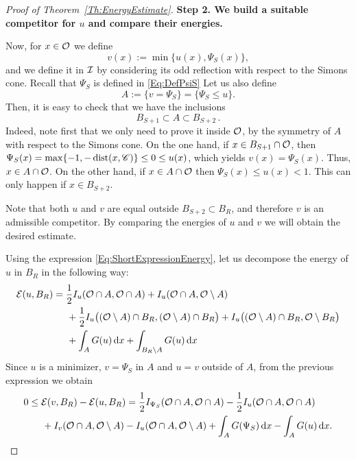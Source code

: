 \begin{proof}[Proof of Theorem~\ref{Th:EnergyEstimate}]
\textbf{Step 2. We build a suitable competitor for $u$ and compare their energies.}

Now, for $x\in \mathcal{O}$ we define
$$ 
v(x) := \min\{u(x),\Psi_S(x)\}, 
$$
and we define it in $\mathcal{I}$ by considering its odd reflection with respect to the Simons cone. Recall that $\Psi_S$ is defined in \eqref{Eq:DefPsiS} Let us also define
$$
A := \{v=\Psi_S\} = \{\Psi_S \leq u\}. 
$$
Then, it is easy to check that we have the inclusions
\begin{equation}
\label{Eq:EnergyEstimateProofInclusionsA}
	B_{S+1} \subset A \subset B_{S+2}\,.
\end{equation}
Indeed, note first that we only need to prove it inside $\mathcal{O}$, by the symmetry of $A$ with respect to the Simons cone. On the one hand, if $ x\in B_{S+1}\cap \mathcal{O}$, then $\Psi_S(x) = \max\{-1,-\operatorname{dist}(x,\mathscr{C})\} \leq 0 \leq u(x)$, which yields $v(x) = \Psi_S(x)$. Thus, $x\in A\cap \mathcal{O}$. On the other hand, if $ x\in A\cap \mathcal{O}$ then $\Psi_S(x) \leq u(x) < 1$. This can only happen if $x\in B_{S+2}$.

Note that both $u$ and $v$ are equal outside $B_{S+2} \subset B_R$, and therefore $v$ is an admissible competitor. By comparing the energies of $u$ and $v$ we will obtain the desired estimate. 

Using the expression \eqref{Eq:ShortExpressionEnergy}, let us decompose the energy of $u$ in $B_R$ in the following way:
\begin{align*}
\mathcal{E}(u,B_R) &= \frac{1}{2}I_u(\mathcal{O} \cap A, \mathcal{O} \cap A) + I_u(\mathcal{O} \cap A, \mathcal{O} \setminus A) \\
& \hspace{5mm} + \frac{1}{2}I_u\big((\mathcal{O} \setminus A) \cap B_R, (\mathcal{O} \setminus A) \cap B_R\big) + I_u\big((\mathcal{O} \setminus A) \cap B_R, \mathcal{O} \setminus B_R\big) \\
& \hspace{5mm} + \int_A G(u) \,\mathrm{d} x + \int_{B_R\setminus A} G(u) \,\mathrm{d} x
\end{align*}
Since $u$ is a minimizer, $v=\Psi_S$ in $A$ and $u=v$ outside of $A$,  from the previous expression we obtain
\begin{align*}
0 &\leq \mathcal{E}(v,B_R)-\mathcal{E}(u,B_R) = \frac{1}{2}I_{\Psi_S}(\mathcal{O} \cap A, \mathcal{O} \cap A) - \frac{1}{2}I_u(\mathcal{O} \cap A, \mathcal{O} \cap A)\\
& \hspace{5mm} + I_v(\mathcal{O} \cap A, \mathcal{O} \setminus A) - I_u(\mathcal{O} \cap A, \mathcal{O} \setminus A) + \int_A G(\Psi_S) \,\mathrm{d} x - \int_{A} G(u) \,\mathrm{d} x.
\end{align*}


\end{proof}
